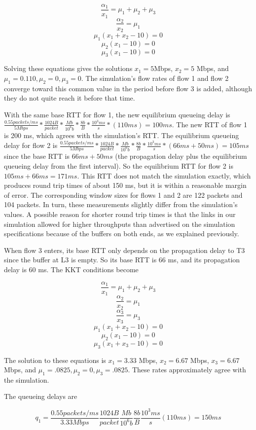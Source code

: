 $$\frac{\alpha_1}{x_1}=\mu_1+\mu_2+\mu_3$$
$$\frac{\alpha_2}{x_2}=\mu_1$$
$$\mu_1 (x_1 + x_2 - 10) = 0$$
$$\mu_2 (x_1 - 10) = 0$$
$$\mu_3 (x_1 - 10) = 0$$

Solving these equations gives the solutions $x_1 = 5$Mbps, $x_2 = 5$ Mbps, and $\mu_1 = 0.110, \mu_2 = 0, \mu_3 = 0$. The simulation's flow rates of flow 1 and flow 2 converge toward this common value in the period before flow 3 is added, although they do not quite reach it before that time.

With the same base RTT for flow 1, the new equilibrium queueing delay is  $\frac{0.55 packets/ms}{5 Mbps} * \frac{1024 B}{packet} * \frac{Mb}{10^6 b} * \frac{8 b}{B} * \frac{10^3 ms}{s} * (110 ms) = 100 ms$. The new RTT of flow 1 is 200 ms, which agrees with the simulation's RTT. The equilibrium queueing delay for flow 2 is $\frac{0.55 packets/ms}{5 Mbps} * \frac{1024 B}{packet} * \frac{Mb}{10^6 b} * \frac{8 b}{B} * \frac{10^3 ms}{s} * (66ms + 50ms) = 105 ms$ since the base RTT is $66 ms + 50 ms$ (the propagation delay plus the equilibrium queueing delay from the first interval). So the equilibrium RTT for flow 2 is $105ms + 66ms = 171 ms$. This RTT does not match the simulation exactly, which produces round trip times of about 150 ms, but it is within a reasonable margin of error.  The corresponding window sizes for flows 1 and 2 are 122 packets and 104 packets. In turn, these measurements slightly differ from the simulation's values. A possible reason for shorter round trip times is that the links in our simulation allowed for higher throughputs than advertised on the simulation specifications because of the buffers on both ends, as we explained previously.

When flow 3 enters, its base RTT only depends on the propagation delay to T3 since the buffer at L3 is empty. So its base RTT is 66 ms, and its propagation delay is 60 ms. The KKT conditions become

$$\frac{\alpha_1}{x_1}=\mu_1+\mu_2+\mu_3$$
$$\frac{\alpha_2}{x_2}=\mu_1$$
$$\frac{\alpha_3}{x_3}=\mu_3$$
$$\mu_1 (x_1 + x_2 - 10) = 0$$
$$\mu_2 (x_1 - 10) = 0$$
$$\mu_3 (x_1 + x_3 - 10) = 0$$

The solution to these equations is $x_1 = 3.33$ Mbps, $x_2 = 6.67$ Mbps, $x_3 = 6.67$ Mbps, and $\mu_1 = .0825, \mu_2 = 0, \mu_3 = .0825$. These rates approximately agree with the simulation.

The queueing delays are

$$q_1 = \frac{0.55 packets/ms}{3.33 Mbps} \frac{1024 B}{packet} \frac{Mb}{10^6 b} \frac{8 b}{B} \frac{10^3 ms}{s} (110 ms) = 150 ms$$


